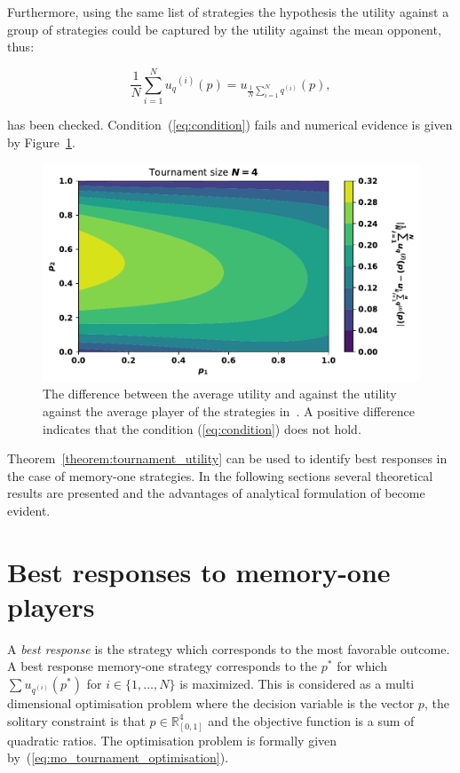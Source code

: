 \documentclass[10pt]{article}
\newcommand{\R}{\mathbb{R}}
\begin{document}
Furthermore, using the same list of strategies the 
hypothesis the utility against a group of strategies could be
captured by the utility against the mean opponent, thus:

\begin{equation}\label{eq:condition}
    \frac{1}{N} \sum_{i=1} ^ {N} {u_q}^{(i)} (p) = u_{\frac {1}{N} \sum\limits_{i=1} ^ N q^{(i)}}(p),
\end{equation}

has been checked. Condition~(\ref{eq:condition}) fails and numerical evidence is
given by Figure~\ref{fig:hypothesis}.

\begin{figure}[!htbp]
    \begin{center}
    \includegraphics[width=.5\linewidth]{img/mean_vs_average_heatmap.pdf}
    \end{center}
    \caption{The difference between the average utility and against
    the utility against the average player of the strategies in~\cite{Stewart2012}.
    A positive difference indicates that the condition (\ref{eq:condition})
    does not hold.}
    \label{fig:hypothesis}
\end{figure}

Theorem~\ref{theorem:tournament_utility} can be used to identify best
responses in the case of memory-one strategies. In the following sections several
theoretical results are presented and the advantages of analytical formulation
of become evident.

\section{Best responses to memory-one players}\label{section:best_response_mem_one}

A \textit{best response} is the strategy which corresponds to the most
favorable outcome. A best response memory-one strategy
corresponds to the \(p^*\) for which \(\sum u_{q ^{(i)}} (p^*)\) for \(i \in \{1, \dots, N\}\)
is maximized. This is considered as a multi dimensional optimisation problem
where the decision variable is the vector \(p\), the solitary constraint is
that \(p \in \R^4_{[0, 1]} \) and the objective function is a sum of quadratic
ratios. The optimisation problem is formally given by~(\ref{eq:mo_tournament_optimisation}).
\end{document}
